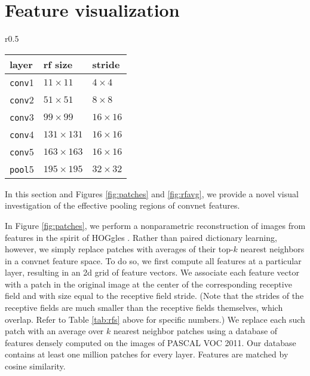 \documentclass{article} \usepackage{nips14submit_e,times}
\begin{document}
\section{Feature visualization}

\begin{wraptable}{r}{0.5\textwidth}
    \centering
    \small
    \caption{Convnet receptive field sizes and strides, for an input of size
    $227 \times 227$. }
    \begin{tabular}{lll}
        layer & rf size & stride \\
        \hline
        \texttt{conv}1 & $11 \times 11$ & $4 \times 4$ \\
        \texttt{conv}2 & $51 \times 51$ & $8 \times 8$ \\
        \texttt{conv}3 & $99 \times 99$ & $16 \times 16$ \\
        \texttt{conv}4 & $131 \times 131$ & $16 \times 16$ \\
        \texttt{conv}5 & $163 \times 163$ & $16 \times 16$ \\
        \texttt{pool}5 & $195 \times 195$ & $32 \times 32$
    \end{tabular}
    \label{tab:rfs}
\end{wraptable}

In this section and Figures \ref{fig:patches} and \ref{fig:rfavg}, we provide a
novel visual investigation of the effective pooling regions of convnet features.

In Figure \ref{fig:patches}, we perform a nonparametric reconstruction of images
from features in the spirit of HOGgles \cite{hoggles}.
Rather than paired dictionary learning, however, we simply replace patches with
averages of their top-$k$ nearest neighbors in a convnet feature space.
To do so, we first compute all features at a particular layer, resulting in an
2d grid of feature vectors.
We associate each feature vector with a patch in the original image at the
center of the corresponding receptive field and with size equal to the receptive
field stride.
(Note that the strides of the receptive fields are much smaller than the
receptive fields themselves, which overlap.
Refer to Table \ref{tab:rfs} above for specific numbers.)
We replace each such patch with an average over $k$ nearest neighbor patches
using a database of features densely computed on the images of PASCAL VOC 2011.
Our database contains at least one million patches for every layer.
Features are matched by cosine similarity.
\end{document}
